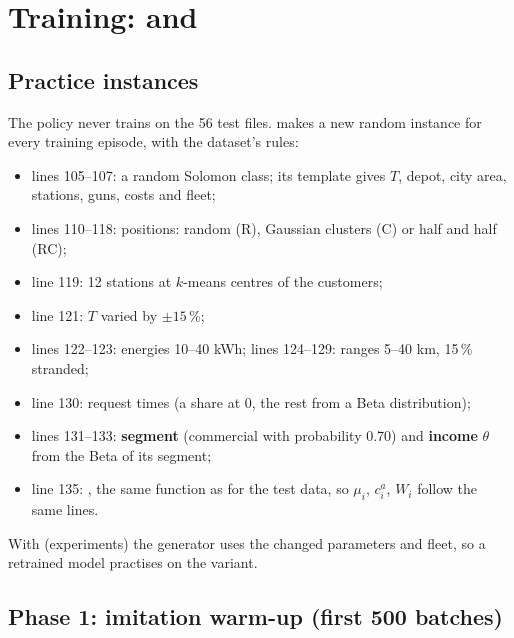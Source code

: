 \section{Training:  and }
\label{sec:training}

\subsection{Practice instances}
\label{sec:generator}

The policy never trains on the 56 test files.  makes a new random instance for every training episode, with the dataset's rules:


\begin{itemize}
  \item lines 105--107: a random Solomon class; its template gives $T$, depot, city area, stations, guns, costs and fleet;
  \item lines 110--118: positions: random (R), Gaussian clusters (C) or half and half (RC);
  \item line 119: 12 stations at $k$-means centres of the customers;
  \item line 121: $T$ varied by $\pm15$\,\%;
  \item lines 122--123: energies 10--40 kWh; lines 124--129: ranges 5--40 km, 15\,\% stranded;
  \item line 130: request times (a share at 0, the rest from a Beta distribution);
  \item lines 131--133: \textbf{segment} (commercial with probability 0.70) and \textbf{income} $\theta$ from the Beta of its segment;
  \item line 135: , the same function as for the test data, so $\mu_i$, $c^a_i$, $W_i$ follow the same lines.
\end{itemize}
With  (experiments) the generator uses the changed parameters and fleet, so a retrained model practises on the variant.

\subsection{Phase 1: imitation warm-up (first 500 batches)}


